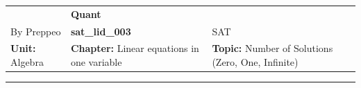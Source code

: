 \documentclass[11pt,paper=a4,answers]{exam}
\begin{document}
\begin{center}
    \centering
    \renewcommand{\arraystretch}{1.5}
    \begin{tabularx}{\textwidth}{YYY}
    & \normalsize\bf{{\Large{{Quant}}}} & \\
    By Preppeo & \normalsize\bf{{sat\_lid\_003}} & SAT\\
    \normalsize{{\textbf{{Unit:}} Algebra}} & \normalsize{{\textbf{{Chapter:}} Linear equations in one variable}} & \normalsize{{\textbf{{Topic:}} Number of Solutions (Zero, One, Infinite)}} \\
    \end{tabularx}
\end{center}
\par\noindent\rule{\textwidth}{1pt}
\end{document}
